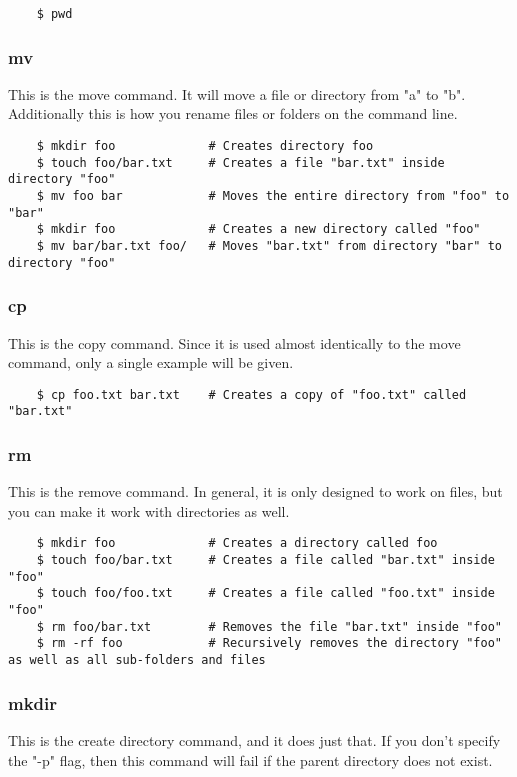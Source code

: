 	\begin{lstlisting}
	$ pwd
	\end{lstlisting}
	

\subsubsection{mv} \mdseries
This is the move command.  It will move a file or directory from "a" to "b".  Additionally this is how you rename files or folders on the command line.

	\begin{lstlisting}
	$ mkdir foo				# Creates directory foo
	$ touch foo/bar.txt		# Creates a file "bar.txt" inside directory "foo"
	$ mv foo bar			# Moves the entire directory from "foo" to "bar"
	$ mkdir foo				# Creates a new directory called "foo"
	$ mv bar/bar.txt foo/	# Moves "bar.txt" from directory "bar" to directory "foo"
	\end{lstlisting}


\subsubsection{cp} \mdseries
This is the copy command.  Since it is used almost identically to the move command, only a single example will be given.

	\begin{lstlisting}
	$ cp foo.txt bar.txt	# Creates a copy of "foo.txt" called "bar.txt"
	\end{lstlisting}

\subsubsection{rm} \mdseries
This is the remove command.  In general, it is only designed to work on files, but you can make it work with directories as well.

	\begin{lstlisting}
	$ mkdir foo				# Creates a directory called foo
	$ touch foo/bar.txt		# Creates a file called "bar.txt" inside "foo"
	$ touch foo/foo.txt		# Creates a file called "foo.txt" inside "foo"
	$ rm foo/bar.txt		# Removes the file "bar.txt" inside "foo"
	$ rm -rf foo			# Recursively removes the directory "foo" as well as all sub-folders and files
	\end{lstlisting}


\subsubsection{mkdir} \mdseries
This is the create directory command, and it does just that.  If you don't specify the "-p" flag, then this command will fail if the parent directory does not exist.

